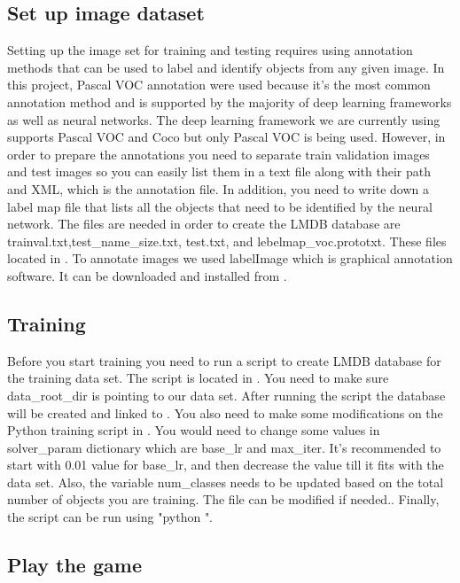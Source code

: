\documentclass[onecolumn, draftclsnofoot,10pt, compsoc]{IEEEtran}
\begin{document}
\subsection{Set up image dataset}

Setting up the image set for training and testing requires using annotation methods that can be used to label and identify objects from any given image.
In this project, Pascal VOC annotation were used because it's the most common annotation method and is supported by the majority of deep learning frameworks as well as neural networks.
The deep learning framework we are currently using supports Pascal VOC and Coco but only Pascal VOC is being used.
However, in order to prepare the annotations you need to separate train validation images and test images so you can easily list them in a text file along with their path and XML, which is the annotation file.
In addition, you need to write down a label map file that lists all the objects that need to be identified by the neural network. 
The files are needed in order to create the LMDB database are trainval.txt,test\_name\_size.txt, test.txt, and lebelmap\_voc.prototxt. 
These files located in . 
To annotate images we used labelImage which is graphical annotation software. 
It can be downloaded and installed from .

\subsection{Training}

Before you start training you need to run a script to create LMDB database for the training data set.
The script is located in .
You need to make sure data\_root\_dir is pointing to our data set.
After running the script the database will be created and linked to .
You also need to make some modifications on the Python training script in .
You would need to change some values in solver\_param dictionary which are base\_lr and max\_iter.
It's recommended to start with 0.01 value for base\_lr, and then decrease the value till it fits with the data set.
Also, the variable num\_classes needs to be updated based on the total number of objects you are training.
The file can be modified if needed..
Finally, the script can be run using "python ".

\subsection{Play the game}
\end{document}
